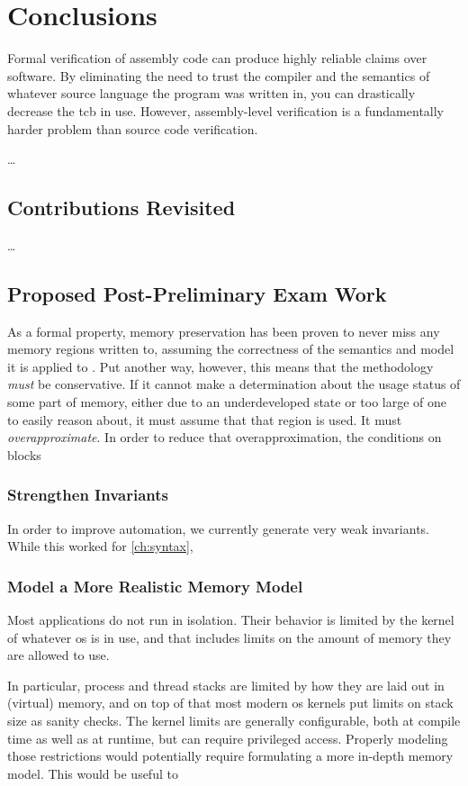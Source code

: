 \chapter{Conclusions}\label{ch:conclusions}
Formal verification of assembly code can produce highly reliable claims over software.
By eliminating the need to trust the compiler
and the semantics of whatever source language the program was written in,
you can drastically decrease the \ac{tcb} in use.
However, assembly-level verification is a fundamentally harder problem
than source code verification.

\todo\dots

\section{Contributions Revisited}
\todo\dots

\section{Proposed Post-Preliminary Exam Work}
As a formal property, memory preservation
has been proven to never miss any memory regions written to,
assuming the correctness of the semantics and model it is applied
to \autocite{bockenek2019preservation,popl2019underreview}.
Put another way, however, this means that the methodology \emph{must} be conservative.
If it cannot make a determination about the usage status of some part of memory,
either due to an underdeveloped state or too large of one to easily reason about,
it must assume that that region is used. It must \emph{overapproximate}.%
In order to reduce that overapproximation, the conditions on blocks

\subsection{Strengthen Invariants}
In order to improve automation, we currently generate very weak invariants.
While this worked for \cref{ch:syntax},

\subsection{Model a More Realistic Memory Model}
Most applications do not run in isolation. Their behavior is limited by
the kernel of whatever \ac{os} is in use,
and that includes limits on the amount of memory they are allowed to use.

In particular, process and thread stacks are limited
by how they are laid out in (virtual) memory, and on top of that
most modern \ac{os} kernels put limits on stack size as sanity checks.
The kernel limits are generally configurable,
both at compile time as well as at runtime, but can require privileged access.
Properly modeling those restrictions
would potentially require formulating a more in-depth memory model.
This would be useful to 
